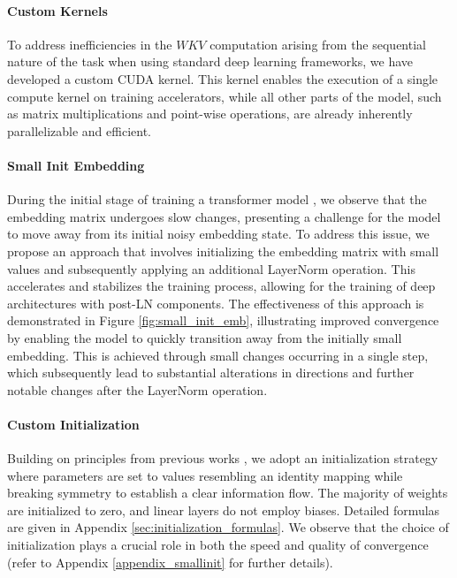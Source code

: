 \paragraph{Custom Kernels} \label{custom_kernel}

To address inefficiencies in the $WKV$ computation arising from the sequential nature of the task when using standard deep learning frameworks, we have developed a custom CUDA kernel. This kernel enables the execution of a single compute kernel on training accelerators, while all other parts of the model, such as matrix multiplications and point-wise operations, are already inherently parallelizable and efficient. 

\paragraph{Small Init Embedding} \label{smallinit}

During the initial stage of training a transformer model \cite{vaswani2017attention}, we observe that the embedding matrix undergoes slow changes, presenting a challenge for the model to move away from its initial noisy embedding state. To address this issue, we propose an approach that involves initializing the embedding matrix with small values and subsequently applying an additional LayerNorm operation. This accelerates and stabilizes the training process, allowing for the training of deep architectures with post-LN components. The effectiveness of this approach is demonstrated in Figure \ref{fig:small_init_emb}, illustrating improved convergence by enabling the model to quickly transition away from the initially small embedding. This is achieved through small changes occurring in a single step, which subsequently lead to substantial alterations in directions and further notable changes after the LayerNorm operation.

\paragraph{Custom Initialization}

Building on principles from previous works \citep{he2016identity, af2_2021_nature}, we adopt an initialization strategy where parameters are set to values resembling an identity mapping while breaking symmetry to establish a clear information flow. The majority of weights are initialized to zero, and linear layers do not employ biases. Detailed formulas are given in Appendix \ref{sec:initialization_formulas}. We observe that the choice of initialization plays a crucial role in both the speed and quality of convergence (refer to Appendix \ref{appendix_smallinit} for further details).

